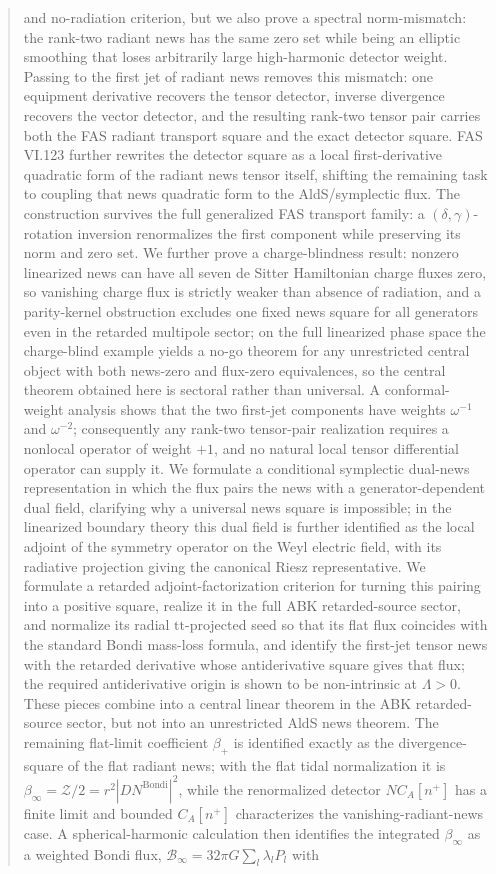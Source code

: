 \documentclass[11pt,a4paper]{article}
\begin{document}
\begin{abstract}
and no-radiation criterion, but we also prove a spectral norm-mismatch: the rank-two radiant news has the same zero set while being an elliptic smoothing that loses arbitrarily large high-harmonic detector weight.  Passing to the first jet of radiant news removes this mismatch: one equipment derivative recovers the tensor detector, inverse divergence recovers the vector detector, and the resulting rank-two tensor pair carries both the FAS radiant transport square and the exact detector square.  FAS VI.123 further rewrites the detector square as a local first-derivative quadratic form of the radiant news tensor itself, shifting the remaining task to coupling that news quadratic form to the AldS/symplectic flux.  The construction survives the full generalized FAS transport family: a \((\delta,\gamma)\)-rotation inversion renormalizes the first component while preserving its norm and zero set.  We further prove a charge-blindness result: nonzero linearized news can have all seven de Sitter Hamiltonian charge fluxes zero, so vanishing charge flux is strictly weaker than absence of radiation, and a parity-kernel obstruction excludes one fixed news square for all generators even in the retarded multipole sector; on the full linearized phase space the charge-blind example yields a no-go theorem for any unrestricted central object with both news-zero and flux-zero equivalences, so the central theorem obtained here is sectoral rather than universal.  A conformal-weight analysis shows that the two first-jet components have weights \(\omega^{-1}\) and \(\omega^{-2}\); consequently any rank-two tensor-pair realization requires a nonlocal operator of weight \(+1\), and no natural local tensor differential operator can supply it.  We formulate a conditional symplectic dual-news representation in which the flux pairs the news with a generator-dependent dual field, clarifying why a universal news square is impossible; in the linearized boundary theory this dual field is further identified as the local adjoint of the symmetry operator on the Weyl electric field, with its radiative projection giving the canonical Riesz representative.  We formulate a retarded adjoint-factorization criterion for turning this pairing into a positive square, realize it in the full ABK retarded-source sector, and normalize its radial \(\mathrm{tt}\)-projected seed so that its flat flux coincides with the standard Bondi mass-loss formula, and identify the first-jet tensor news with the retarded derivative whose antiderivative square gives that flux; the required antiderivative origin is shown to be non-intrinsic at \(\Lambda>0\).  These pieces combine into a central linear theorem in the ABK retarded-source sector, but not into an unrestricted AldS news theorem.  The remaining flat-limit coefficient \(\beta_+\) is identified exactly as the divergence-square of the flat radiant news; with the flat tidal normalization it is \(\beta_\infty=\mathcal Z/2=r^2|D N^{\mathrm{Bondi}}|^2\), while the renormalized detector \(N C_A[n^+]\) has a finite limit and bounded \(C_A[n^+]\) characterizes the vanishing-radiant-news case.  A spherical-harmonic calculation then identifies the integrated \(\beta_\infty\) as a weighted Bondi flux, \(\mathcal B_\infty=32\pi G\sum_l\lambda_lP_l\) with 
\end{abstract}
\end{document}
